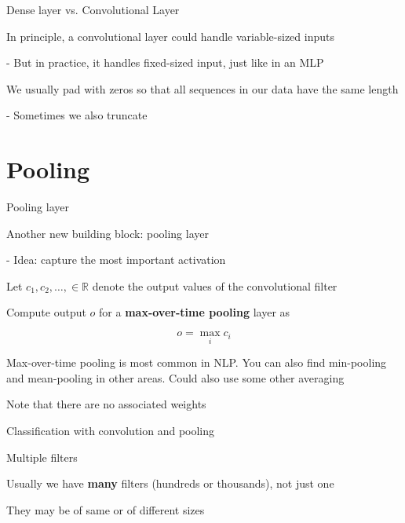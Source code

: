 \documentclass[12pt]{beamer}
\begin{document}
\begin{frame}{Dense layer vs. Convolutional Layer}

In principle, a convolutional layer could handle variable-sized
inputs

 - But in practice, it handles fixed-sized input, just like in an MLP

We usually pad with zeros so that all sequences in our data have the
same length

- Sometimes we also truncate
	

\end{frame}


\section{Pooling}

\begin{frame}{Pooling layer}
	
Another new building block: pooling layer

- Idea: capture the most important activation

Let $c_1, c_2, \dots, \in \mathbb{R}$ denote the output values of the convolutional filter

Compute output $o$ for a \textbf{max-over-time pooling} layer as

$$
o = \max_i c_i
$$


Max-over-time pooling is most common in NLP. You can also find min-pooling and mean-pooling in other areas. Could also use some other averaging

Note that there are no associated weights

	
\end{frame}

\begin{frame}[fragile]{Classification with convolution and pooling}

\begin{figure}
	\scalebox{0.9}{
		\hspace{-1.5cm}
	}
\end{figure}

\end{frame}


\begin{frame}{Multiple filters}


Usually we have \textbf{many} filters (hundreds or thousands), not just
one

They may be of same or of different sizes

\end{frame}
\end{document}
